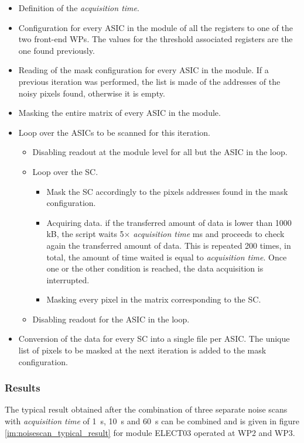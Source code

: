 		\begin{itemize}
			\item Definition of the \textit{acquisition time}.
			\item Configuration for every ASIC in the module of all the registers to one of the two front-end WPs. The values for the threshold associated registers are the one found previously. 
			\item Reading of the mask configuration for every ASIC in the module. If a previous iteration was performed, the list is made of the addresses of the noisy pixels found, otherwise it is empty. 
			\item Masking the entire matrix of every ASIC in the module. 
			\item Loop over the ASICs to be scanned for this iteration.
			\begin{itemize}
				\item Disabling readout at the module level for all but the ASIC in the loop.
				\item Loop over the SC.
				\begin{itemize}
					\item Mask the SC accordingly to the pixels addresses found in the mask configuration.
					\item Acquiring data. if the transferred amount of data is lower than 1000 kB, the script waits 5$\times$ \textit{acquisition time} ms and proceeds to check again the transferred amount of data. This is repeated 200 times, in total, the amount of time waited is equal to \textit{acquisition time}. Once one or the other condition is reached, the data acquisition is interrupted.
					\item Masking every pixel in the matrix corresponding to the SC.  
				\end{itemize}
				\item Disabling readout for the ASIC in the loop.
			\end{itemize}
			\item Conversion of the data for every SC into a single file per ASIC. The unique list of pixels to be masked at the next iteration is added to the mask configuration. 
		\end{itemize}
		
		
		\subsubsection{Results}
		
		The typical result obtained after the combination of three separate noise scans with \textit{acquisition time} of \SI{1}{\second}, \SI{10}{\second} and \SI{60}{\second} can be combined and is given in figure \ref{im:noisescan_typical_result} for module ELECT03 operated at WP2 and WP3. 
		
